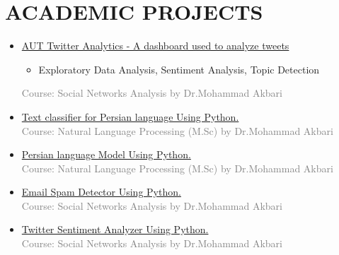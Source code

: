 \documentclass[10pt,a4paper,sans]{moderncv} %
\begin{document}
	
	\section{ACADEMIC PROJECTS}
	\begin{itemize}
	
	    \item \href{https://github.com/AUT-Twitter-Analytics}{AUT Twitter Analytics - A dashboard used to analyze tweets}
	    \begin{itemize}
            \item Exploratory Data Analysis, Sentiment Analysis, Topic Detection

	    \end{itemize}
			\textcolor{gray}{Course: Social Networks Analysis by Dr.Mohammad Akbari}
		\vspace{0.25em}
		
		\item \href{https://bit.ly/3smNFbz}{Text classifier for Persian language Using Python.}\\
			\textcolor{gray}{Course: Natural Language Processing (M.Sc) by Dr.Mohammad Akbari}
		\vspace{0.25em}

		\item \href{https://bit.ly/3bF2Zuo}{Persian language Model Using Python.}\\
			\textcolor{gray}{Course: Natural Language Processing (M.Sc) by Dr.Mohammad Akbari}
		\vspace{0.25em}

		\item \href{https://bit.ly/39y6Rus}{Email Spam Detector Using Python.}\\
			\textcolor{gray}{Course: Social Networks Analysis by Dr.Mohammad Akbari}
		\vspace{0.25em}
		
		\item \href{https://bit.ly/38K9gmG}{Twitter Sentiment Analyzer Using Python.}\\
			\textcolor{gray}{Course: Social Networks Analysis by Dr.Mohammad Akbari}
		\vspace{0.25em}
		
		

\end{itemize}
\end{document}
